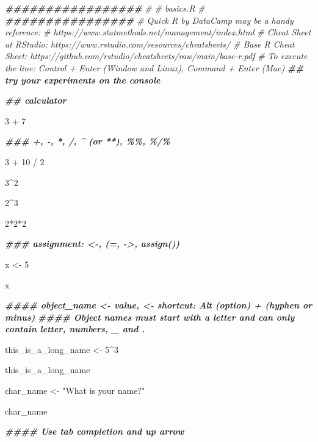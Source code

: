 \documentclass[
]{article}
\newenvironment{Shaded}{\begin{snugshade}}{\end{snugshade}}
\newcommand{\CommentTok}[1]{\textcolor[rgb]{0.56,0.35,0.01}{\textit{#1}}}
\newcommand{\DecValTok}[1]{\textcolor[rgb]{0.00,0.00,0.81}{#1}}
\newcommand{\DocumentationTok}[1]{\textcolor[rgb]{0.56,0.35,0.01}{\textbf{\textit{#1}}}}
\newcommand{\NormalTok}[1]{#1}
\newcommand{\OtherTok}[1]{\textcolor[rgb]{0.56,0.35,0.01}{#1}}
\newcommand{\SpecialCharTok}[1]{\textcolor[rgb]{0.00,0.00,0.00}{#1}}
\newcommand{\StringTok}[1]{\textcolor[rgb]{0.31,0.60,0.02}{#1}}
\begin{document}
\begin{Shaded}
\begin{Highlighting}[]
\DocumentationTok{\#\#\#\#\#\#\#\#\#\#\#\#\#\#\#\#\#}
\CommentTok{\#}
\CommentTok{\# basics.R}
\CommentTok{\#}
\DocumentationTok{\#\#\#\#\#\#\#\#\#\#\#\#\#\#\#\#}
\CommentTok{\# \textquotesingle{}Quick R\textquotesingle{} by DataCamp may be a handy reference: }
\CommentTok{\#     https://www.statmethods.net/management/index.html}
\CommentTok{\# Cheat Sheet at RStudio: https://www.rstudio.com/resources/cheatsheets/}
\CommentTok{\# Base R Cheat Sheet: https://github.com/rstudio/cheatsheets/raw/main/base{-}r.pdf}
\CommentTok{\# To execute the line: Control + Enter (Window and Linux), Command + Enter (Mac)}
\DocumentationTok{\#\# try your experiments on the console}

\DocumentationTok{\#\# calculator}

\DecValTok{3} \SpecialCharTok{+} \DecValTok{7}

\DocumentationTok{\#\#\# +, {-}, *, /, \^{} (or **), \%\%, \%/\%}

\DecValTok{3} \SpecialCharTok{+} \DecValTok{10} \SpecialCharTok{/} \DecValTok{2}

\DecValTok{3}\SpecialCharTok{\^{}}\DecValTok{2}

\DecValTok{2}\SpecialCharTok{\^{}}\DecValTok{3}

\DecValTok{2}\SpecialCharTok{*}\DecValTok{2}\SpecialCharTok{*}\DecValTok{2}

\DocumentationTok{\#\#\# assignment: \textless{}{-}, (=, {-}\textgreater{}, assign()) }

\NormalTok{x }\OtherTok{\textless{}{-}} \DecValTok{5}

\NormalTok{x }

\DocumentationTok{\#\#\#\# object\_name \textless{}{-} value, \textquotesingle{}\textless{}{-}\textquotesingle{} shortcut: Alt (option) + \textquotesingle{}{-}\textquotesingle{} (hyphen or minus) }
\DocumentationTok{\#\#\#\# Object names must start with a letter and can only contain letter, numbers, \_ and .}

\NormalTok{this\_is\_a\_long\_name }\OtherTok{\textless{}{-}} \DecValTok{5}\SpecialCharTok{\^{}}\DecValTok{3}

\NormalTok{this\_is\_a\_long\_name}

\NormalTok{char\_name }\OtherTok{\textless{}{-}} \StringTok{"What is your name?"}

\NormalTok{char\_name}

\DocumentationTok{\#\#\#\# Use \textquotesingle{}tab completion\textquotesingle{} and \textquotesingle{}up arrow\textquotesingle{}}


\end{Highlighting}
\end{Shaded}
\end{document}
